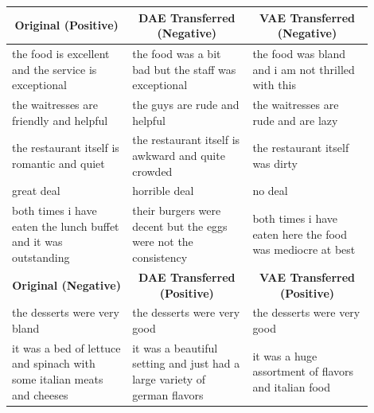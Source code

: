 \documentclass[letterpaper]{article} %
\newcommand{\tabh}[1]{\multicolumn{1}{c|}{\textbf{#1}}}
\newcommand{\tabc}[2]{\multicolumn{1}{|c||}{\multirow{#1}{*}{\textbf{#2}}}}
\begin{document}
\begin{table}[ht]
	\centering
	\footnotesize
	\begin{tabular}{| p{0.3\linewidth} || p{0.3\linewidth} | p{0.3\linewidth} |}
		\hline
		\tabc{1}{Original (Positive)}                                           & \tabh{DAE Transferred (Negative)}                                         & \tabh{VAE Transferred (Negative)}                          \\
		\hline
		\hline
		the food is excellent and the service is exceptional                    & the food was a bit bad but the staff was exceptional                      & the food was bland and i am not thrilled with this         \\
		\hline
		the waitresses are friendly and helpful                                 & the guys are rude and helpful                                             & the waitresses are rude and are lazy                       \\
		\hline
		the restaurant itself is romantic and quiet                             & the restaurant itself is awkward and quite crowded                        & the restaurant itself was dirty                            \\
		\hline
		great deal                                                              & horrible deal                                                             & no deal                                                    \\
		\hline
		both times i have eaten the lunch buffet and it was outstanding         & their burgers were decent but the eggs were not the consistency           & both times i have eaten here the food was mediocre at best \\
		\hline
		\hline
		\tabc{1}{Original (Negative)}                                           & \tabh{DAE Transferred (Positive)}                                         & \tabh{VAE Transferred (Positive)}                          \\
		\hline
		\hline
		the desserts were very bland                                            & the desserts were very good                                               & the desserts were very good                                \\
		\hline
		it was a bed of lettuce and spinach with some italian meats and cheeses & it was a beautiful setting and just had a large variety of german flavors & it was a huge assortment of flavors and italian food       \\
		\hline

\end{tabular}
\end{table}
\end{document}
